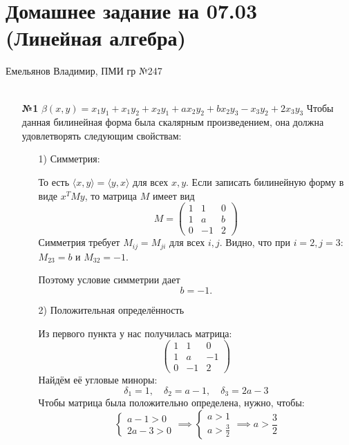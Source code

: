 \documentclass[a4paper]{article}
\renewcommand{\f}[2]{\frac{#1}{#2}}
\newcommand{\case}[1]{\begin{cases} #1 \end{cases}}
\begin{document}
\section*{Домашнее задание на 07.03 (Линейная алгебра)}
 {\large Емельянов Владимир, ПМИ гр №247}\\\\
\begin{enumerate}
    \item[\textbf{№1}]$\beta(x, y) = x_1y_1 + x_1y_2 + x_2y_1 + ax_2y_2 + bx_2y_3 - x_3y_2 + 2x_3y_3$
    Чтобы данная билинейная форма была скалярным произведением, она должна удовлетворять следующим свойствам:
    \begin{enumerate}
        \item[1)] Симметрия:
        
        То есть \(\langle x,y\rangle = \langle y,x\rangle\) для всех \(x,y\). Если записать билинейную форму в виде \(x^T M y\), то матрица \(M\) имеет вид
        \[
        M=\begin{pmatrix}
        1 & 1 & 0\\[1mm]
        1 & a & b\\[1mm]
        0 & -1 & 2
        \end{pmatrix}
        \]
        Симметрия требует \(M_{ij} = M_{ji}\) для всех \(i,j\). Видно, что
        при \(i=2,j=3\): \(M_{23}=b\) и \(M_{32}=-1\). 
        
        Поэтому условие симметрии дает
        \[
        b=-1.
        \]

        \item[2)] Положительная определённость
        
        Из первого пункта у нас получилась матрица:
        \[
        \begin{pmatrix}
        1 & 1 & 0\\[1mm]
        1 & a & -1\\[1mm]
        0 & -1 & 2
        \end{pmatrix}
        \]
        Найдём её угловые миноры:
        $$\delta_1 = 1, \quad \delta_2 = a-1, \quad \delta_3 = 2a-3$$
        Чтобы матрица была положительно определена, нужно, чтобы:
        $$\case{
            a-1 >0\\
            2a-3>0
        } \implies \case{
            a > 1\\
            a > \f{3}{2}
        } \implies a > \f{3}{2}$$

    \end{enumerate}


\end{enumerate}
\end{document}
